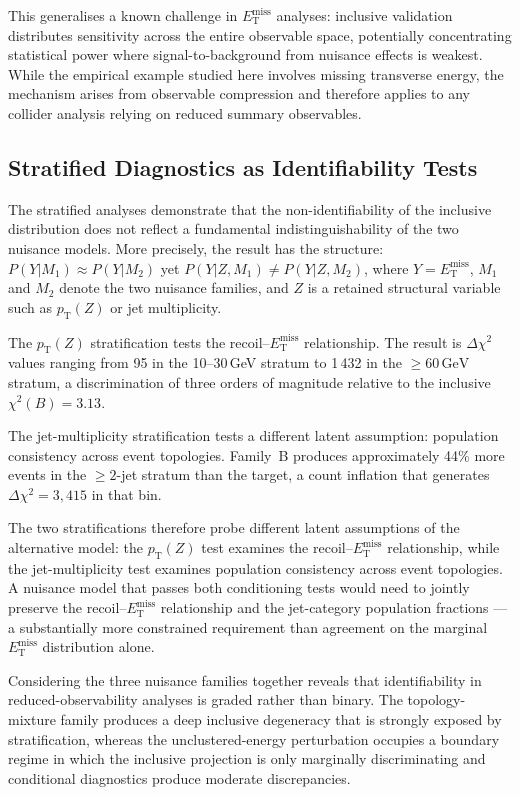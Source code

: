 \documentclass[a4paper,11pt]{article}
\newcommand{\MET}{\ensuremath{E_{\mathrm{T}}^{\mathrm{miss}}}\xspace}
\newcommand{\pTZ}{\ensuremath{p_{\mathrm{T}}(Z)}\xspace}
\newcommand{\Dchisq}{\ensuremath{\Delta\chi^2}\xspace}
\begin{document}
This generalises a known challenge in \MET analyses: inclusive validation
distributes sensitivity across the entire observable space, potentially
concentrating statistical power where signal-to-background from nuisance
effects is weakest.
While the empirical example studied here involves missing transverse energy,
the mechanism arises from observable compression and therefore applies to
any collider analysis relying on reduced summary observables.

\subsection{Stratified Diagnostics as Identifiability Tests}

The stratified analyses demonstrate that the non-identifiability of the
inclusive distribution does not reflect a fundamental indistinguishability
of the two nuisance models.
More precisely, the result has the structure:
$P(Y|M_1) \approx P(Y|M_2)$ yet $P(Y|Z, M_1) \neq P(Y|Z, M_2)$,
where $Y = \MET$, $M_1$ and $M_2$ denote the two nuisance families, and
$Z$ is a retained structural variable such as \pTZ or jet multiplicity.

The \pTZ stratification tests the recoil--\MET relationship.
The result is $\Dchisq$ values ranging from 95 in the 10--30\,GeV stratum
to 1\,432 in the $\geq\!60\,\mathrm{GeV}$ stratum, a discrimination of
three orders of magnitude relative to the inclusive $\chi^2(B) = 3.13$.

The jet-multiplicity stratification tests a different latent assumption:
population consistency across event topologies.
Family~B produces approximately 44\% more events in the $\geq\!2$-jet
stratum than the target, a count inflation that generates
$\Dchisq = 3{,}415$ in that bin.

The two stratifications therefore probe different latent assumptions of the
alternative model: the \pTZ test examines the recoil--\MET relationship,
while the jet-multiplicity test examines population consistency across event
topologies.
A nuisance model that passes both conditioning tests would need to jointly
preserve the recoil--\MET relationship and the jet-category population
fractions --- a substantially more constrained requirement than agreement
on the marginal \MET distribution alone.

Considering the three nuisance families together reveals that
identifiability in reduced-observability analyses is graded rather than
binary.
The topology-mixture family produces a deep inclusive degeneracy that is
strongly exposed by stratification, whereas the unclustered-energy
perturbation occupies a boundary regime in which the inclusive projection
is only marginally discriminating and conditional diagnostics produce
moderate discrepancies.
\end{document}
